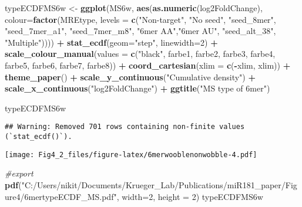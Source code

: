 \documentclass[
]{article}
\newenvironment{Shaded}{\begin{snugshade}}{\end{snugshade}}
\newcommand{\AttributeTok}[1]{\textcolor[rgb]{0.13,0.29,0.53}{#1}}
\newcommand{\CommentTok}[1]{\textcolor[rgb]{0.56,0.35,0.01}{\textit{#1}}}
\newcommand{\DecValTok}[1]{\textcolor[rgb]{0.00,0.00,0.81}{#1}}
\newcommand{\FunctionTok}[1]{\textcolor[rgb]{0.13,0.29,0.53}{\textbf{#1}}}
\newcommand{\NormalTok}[1]{#1}
\newcommand{\OtherTok}[1]{\textcolor[rgb]{0.56,0.35,0.01}{#1}}
\newcommand{\SpecialCharTok}[1]{\textcolor[rgb]{0.81,0.36,0.00}{\textbf{#1}}}
\newcommand{\StringTok}[1]{\textcolor[rgb]{0.31,0.60,0.02}{#1}}
\begin{document}
\begin{Shaded}
\begin{Highlighting}[]
\NormalTok{typeECDFMS6w }\OtherTok{\textless{}{-}} \FunctionTok{ggplot}\NormalTok{(MS6w, }\FunctionTok{aes}\NormalTok{(}\FunctionTok{as.numeric}\NormalTok{(log2FoldChange), }
                              \AttributeTok{colour=}\FunctionTok{factor}\NormalTok{(MREtype, }\AttributeTok{levels =} \FunctionTok{c}\NormalTok{(}\StringTok{"Non{-}target"}\NormalTok{, }\StringTok{"No seed"}\NormalTok{, }\StringTok{"seed\_8mer"}\NormalTok{, }\StringTok{"seed\_7mer\_a1"}\NormalTok{, }\StringTok{"seed\_7mer\_m8"}\NormalTok{, }\StringTok{"6mer AA"}\NormalTok{,}\StringTok{"6mer AU"}\NormalTok{, }\StringTok{"seed\_alt\_38"}\NormalTok{, }\StringTok{"Multiple"}\NormalTok{)))) }\SpecialCharTok{+} 
  \FunctionTok{stat\_ecdf}\NormalTok{(}\AttributeTok{geom=}\StringTok{"step"}\NormalTok{, }\AttributeTok{linewidth=}\DecValTok{2}\NormalTok{) }\SpecialCharTok{+}
  \FunctionTok{scale\_colour\_manual}\NormalTok{(}\AttributeTok{values =} \FunctionTok{c}\NormalTok{(}\StringTok{"black"}\NormalTok{, farbe1, farbe2, farbe3, farbe4, farbe5, farbe6, farbe7, farbe8)) }\SpecialCharTok{+}
  \FunctionTok{coord\_cartesian}\NormalTok{(}\AttributeTok{xlim =} \FunctionTok{c}\NormalTok{(}\SpecialCharTok{{-}}\NormalTok{xlim, xlim)) }\SpecialCharTok{+} 
  \FunctionTok{theme\_paper}\NormalTok{() }\SpecialCharTok{+}
  \FunctionTok{scale\_y\_continuous}\NormalTok{(}\StringTok{"Cumulative density"}\NormalTok{) }\SpecialCharTok{+} \FunctionTok{scale\_x\_continuous}\NormalTok{(}\StringTok{"log2FoldChange"}\NormalTok{) }\SpecialCharTok{+}
  \FunctionTok{ggtitle}\NormalTok{(}\StringTok{"MS type of 6mer"}\NormalTok{)}

\NormalTok{typeECDFMS6w}
\end{Highlighting}
\end{Shaded}

\begin{verbatim}
## Warning: Removed 701 rows containing non-finite values (`stat_ecdf()`).
\end{verbatim}

\texttt{[image: Fig4\_2\_files/figure-latex/6merwooblenonwobble-4.pdf]}

\begin{Shaded}
\begin{Highlighting}[]
\CommentTok{\#export}
\FunctionTok{pdf}\NormalTok{(}\StringTok{"C:/Users/nikit/Documents/Krueger\_Lab/Publications/miR181\_paper/Figure4/6mertypeECDF\_MS.pdf"}\NormalTok{, }\AttributeTok{width=}\DecValTok{2}\NormalTok{, }\AttributeTok{height =} \DecValTok{2}\NormalTok{)}
\NormalTok{typeECDFMS6w}
\end{Highlighting}
\end{Shaded}
\end{document}
